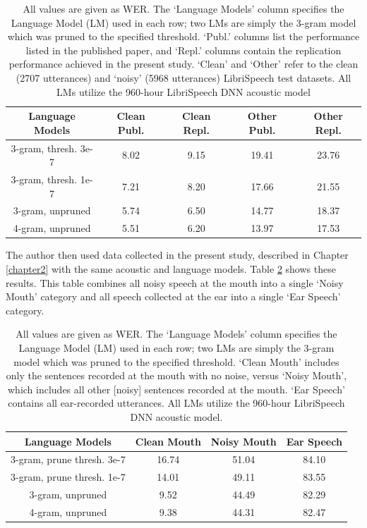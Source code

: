 \begin{table}[h]
\begin{center}
\begin{tabular}{| c || c | c | c | c |} \hline
Language Models & Clean Publ. & Clean Repl. & Other Publ. & Other Repl. \\ \hline\hline
3-gram, thresh. 3e-7 & 8.02 & 9.15 & 19.41 & 23.76 \\ \hline
3-gram, thresh. 1e-7 & 7.21 & 8.20 & 17.66 & 21.55 \\ \hline
3-gram, unpruned & 5.74 & 6.50 & 14.77 & 18.37 \\ \hline
4-gram, unpruned & 5.51 & 6.20 & 13.97 & 17.53 \\ \hline
\end{tabular}
\end{center}
\caption{All values are given as WER.  The `Language Models' column specifies the Language Model (LM) used in each row; two LMs are simply the 3-gram model which was pruned to the specified threshold.  `Publ.' columns list the performance listed in the published paper, and `Repl.' columns contain the replication performance achieved in the present study.  `Clean' and `Other' refer to the clean (2707 utterances) and `noisy' (5968 utterances) LibriSpeech test datasets. All LMs utilize the 960-hour LibriSpeech DNN acoustic model}\label{tab:sanity-check}
\end{table}

The author then used data collected in the present study, described in Chapter \ref{chapter2} with the same acoustic and language models.  Table \ref{tab:basic-run} shows these results.  This table combines all noisy speech at the mouth into a single `Noisy Mouth' category and all speech collected at the ear into a single `Ear Speech' category.

\begin{table}[h]
\begin{center}
\begin{tabular}{| c || c | c | c |} \hline
Language Models & Clean Mouth & Noisy Mouth & Ear Speech \\ \hline\hline
3-gram, prune thresh. 3e-7 & 16.74 & 51.04 & 84.10 \\ \hline
3-gram, prune thresh. 1e-7 & 14.01 & 49.11 & 83.55 \\ \hline
3-gram, unpruned & 9.52 & 44.49 & 82.29 \\ \hline
4-gram, unpruned & 9.38 & 44.31 & 82.47 \\ \hline
\end{tabular}
\end{center}
\caption{All values are given as WER. The `Language Models' column specifies the Language Model (LM) used in each row; two LMs are simply the 3-gram model which was pruned to the specified threshold.  `Clean Mouth' includes only the sentences recorded at the mouth with no noise, versus `Noisy Mouth', which includes all other [noisy] sentences recorded at the mouth. `Ear Speech' contains all ear-recorded utterances.  All LMs utilize the 960-hour LibriSpeech DNN acoustic model.}\label{tab:basic-run}
\end{table}

